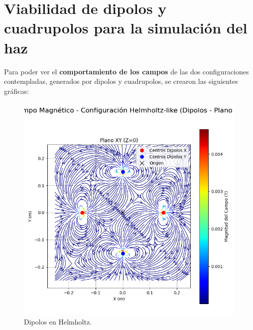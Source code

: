 \section{Viabilidad de dipolos y cuadrupolos para la simulación del haz}

Para poder ver el \textbf{comportamiento de los campos} de las dos configuraciones contempladas, generados por dipolos y cuadrupolos, se crearon las siguientes gráficas:

\begin{figure}[H] %
    \centering
    \begin{minipage}[b]{0.48\textwidth} %
        \includegraphics[width=\linewidth, trim={0cm 2cm 0cm 1cm}, clip]{Sections/Figures/helmholtz_dipoles_xy_field.png} %
        \caption{Dipolos en Helmholtz.}
        \label{fig:helmholtz_dipoles_xy_field}
    \end{minipage}
    \hfill
    \begin{minipage}[b]{0.48\textwidth} %

\end{minipage}
\end{figure}
